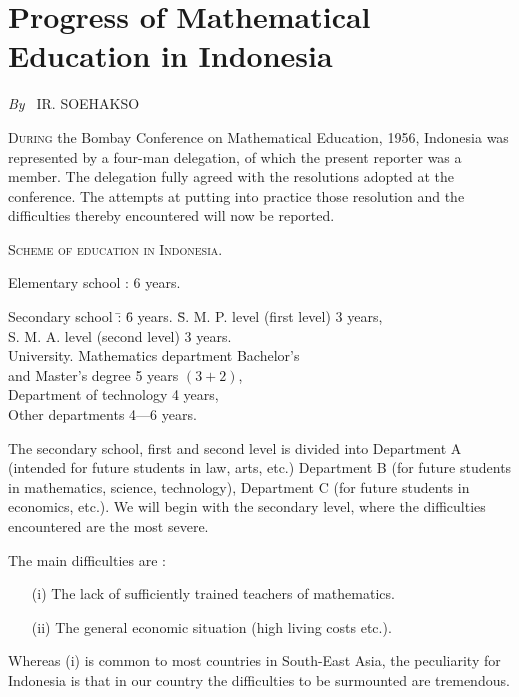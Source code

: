 
\chapter{Progress of Mathematical Education in Indonesia}

\begin{center}
{\em By~} IR. SOEHAKSO
\end{center}

\textsc{During} the Bombay Conference on Mathematical Education, 1956,
Indonesia was represented by a four-man delegation, of which the
present reporter was a member. The  delegation fully agreed with the
resolutions adopted at the conference. The attempts at putting into
practice those resolution and the difficulties thereby encountered
will now be reported.

\medskip
\noindent
\textsc{Scheme of education in Indonesia.}

\smallskip
\noindent
Elementary school : 6 years.
\begin{tabbing}
Secondary school \= : \= 6 years. \= S. M. P. level (first level) 3 years,\\
\> \> \> S. M. A. level (second level) 3 years.\\[0.1cm]
University. \>\>\> Mathematics department Bachelor's\\
\>\>\> and Master's degree 5 years $(3+2)$,\\
\>\>\> Department of technology 4 years, \\
\>\>\> Other departments 4---6 years.
\end{tabbing}

The secondary school, first and second level is divided into
Department A (intended for future students in law, arts, etc.)
Department B (for future students in mathematics, science,
technology), Department C (for future students in economics, etc.). We
will begin with the secondary level, where the difficulties
encountered are the most severe. 

The main difficulties are :
\begin{itemize}
\item[(i)] The lack of sufficiently trained teachers of mathematics. 

\item[(ii)] The general economic situation (high living costs etc.).
\end{itemize}

Whereas (i) is common to most countries in South-East Asia, the
peculiarity for Indonesia is that in our country the difficulties to
be surmounted are tremendous.

